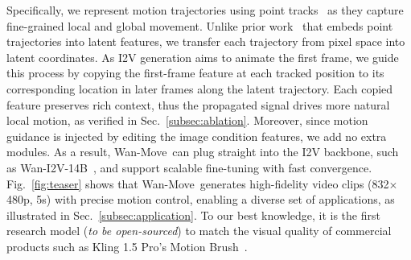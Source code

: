 \documentclass{article}
\newcommand{\method}{Wan-Move}
\begin{document}
Specifically, we represent motion trajectories using point tracks~\cite{geng2024motion} as they capture fine-grained local and global movement.
Unlike prior work~\cite{geng2024motion} that embeds point trajectories into latent features, we transfer each trajectory from pixel space into latent coordinates.
As I2V generation aims to animate the first frame, we guide this process by copying the first-frame feature at each tracked position to its corresponding location in later frames along the latent trajectory.
Each copied feature preserves rich context, thus the propagated signal drives more natural local motion, as verified in Sec.~\ref{subsec:ablation}. Moreover, since motion guidance is injected by editing the image condition features, we add no extra modules.
As a result, \method~can plug straight into the I2V backbone, such as Wan-I2V-14B~\cite{wan}, and support scalable fine-tuning with fast convergence.
Fig.~\ref{fig:teaser} shows that \method~generates high-fidelity video clips (832$\times$480p, 5s) with precise motion control, enabling a diverse set of applications, as illustrated in Sec.~\ref{subsec:application}.
To our best knowledge, it is the first research model (\textit{to be open-sourced}) to match the visual quality of commercial products such as Kling 1.5 Pro’s Motion Brush~\cite{kuaishou2024kling}.
\end{document}

